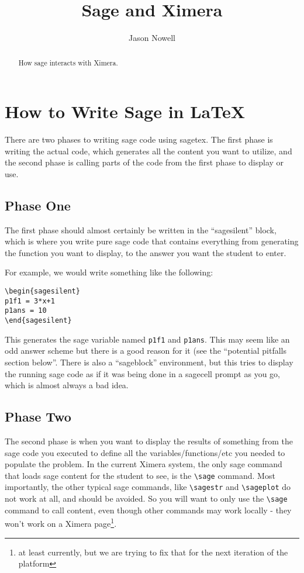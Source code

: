 \documentclass{ximera}
\title{Sage and Ximera}
\author{Jason Nowell}
\begin{document}
\begin{abstract}
     How sage interacts with Ximera.
\end{abstract}
\maketitle


\section{How to Write Sage in LaTeX}

There are two phases to writing sage code using sagetex. The first phase is writing the actual code, which generates all the content you want to utilize, and the second phase is calling parts of the code from the first phase to display or use.

\subsection{Phase One}

The first phase should almost certainly be written in the ``sagesilent'' block, which is where you write pure sage code that contains everything from generating the function you want to display, to the answer you want the student to enter.

For example, we would write something like the following:
\begin{verbatim}
\begin{sagesilent}
p1f1 = 3*x+1
p1ans = 10
\end{sagesilent}
\end{verbatim}
This generates the sage variable named \verb|p1f1| and \verb|p1ans|. This may seem like an odd answer scheme but there is a good reason for it (see the ``potential pitfalls section below''. There is also a ``sageblock'' environment, but this tries to display the running sage code as if it was being done in a sagecell prompt as you go, which is almost always a bad idea.

\subsection{Phase Two}

The second phase is when you want to display the results of something from the sage code you executed to define all the variables/functions/etc you needed to populate the problem. In the current Ximera system, the only sage command that loads sage content for the student to see, is the \verb|\sage| command. Most importantly, the other typical sage commands, like \verb|\sagestr| and \verb|\sageplot| do not work at all, and should be avoided. So you will want to only use the \verb|\sage| command to call content, even though other commands may work locally - they won't work on a Ximera page\footnote{at least currently, but we are trying to fix that for the next iteration of the platform}.
\end{document}
